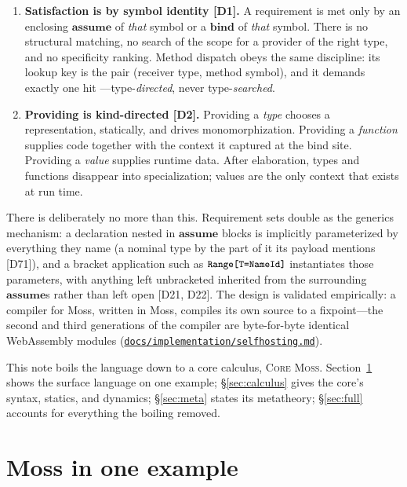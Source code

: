 \documentclass[10pt]{article}
\newcommand{\kw}[1]{\mathbf{#1}}          %
\newcommand{\smallcode}[1]{\texttt{\small #1}}
\theoremstyle{plain}
\theoremstyle{remark}
\begin{document}
\begin{enumerate}
\item \textbf{Satisfaction is by symbol identity [D1].} A requirement is
met only by an enclosing $\kw{assume}$ of \emph{that} symbol or a
$\kw{bind}$ of \emph{that} symbol. There is no structural matching, no
search of the scope for a provider of the right type, and no specificity
ranking. Method dispatch obeys the same discipline: its lookup key is the
pair (receiver type, method symbol), and it demands exactly one hit
---type-\emph{directed}, never type-\emph{searched}.
\item \textbf{Providing is kind-directed [D2].} Providing a \emph{type}
chooses a representation, statically, and drives monomorphization.
Providing a \emph{function} supplies code together with the context it
captured at the bind site. Providing a \emph{value} supplies runtime
data. After elaboration, types and functions disappear into
specialization; values are the only context that exists at run time.
\end{enumerate}

There is deliberately no more than this. Requirement sets double as the
generics mechanism: a declaration nested in $\kw{assume}$ blocks is
implicitly parameterized by everything they name (a nominal type by the
part of it its payload mentions [D71]), and a bracket
application such as $\smallcode{Range[T=NameId]}$ instantiates those
parameters, with anything left unbracketed inherited from the
surrounding $\kw{assume}$s rather than left open [D21, D22]. The design
is validated
empirically: a compiler for Moss, written in Moss, compiles its own
source to a fixpoint---the second and third generations of the compiler
are byte-for-byte identical WebAssembly modules
(\href{https://github.com/moss-lang/moss/blob/ml-modules/docs/implementation/selfhosting.md}{\texttt{docs/implementation/selfhosting.md}}).

This note boils the language down to a core calculus, \textsc{Core
Moss}. Section~\ref{sec:example} shows the surface language on one
example; \S\ref{sec:calculus} gives the core's syntax, statics, and
dynamics; \S\ref{sec:meta} states its metatheory;
\S\ref{sec:full} accounts for everything the boiling removed.

\section{Moss in one example}\label{sec:example}
\end{document}
